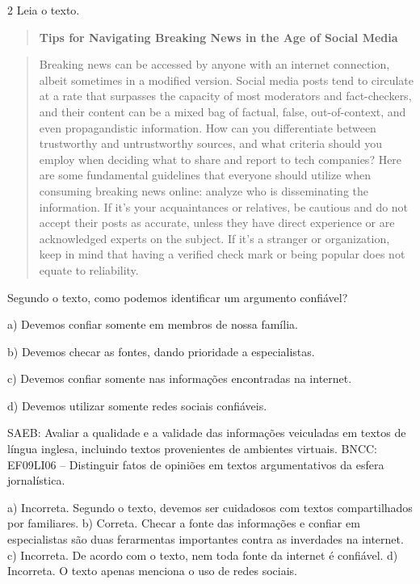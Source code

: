 \num{2} Leia o texto.

\begin{quote}
\textbf{Tips for Navigating Breaking News in the Age of Social Media}
\end{quote}

\begin{quote}
Breaking news can be accessed by anyone with an internet connection,
albeit sometimes in a modified version. Social media posts tend to
circulate at a rate that surpasses the capacity of most moderators and
fact-checkers, and their content can be a mixed bag of factual, false,
out-of-context, and even propagandistic information. How can you
differentiate between trustworthy and untrustworthy sources, and what
criteria should you employ when deciding what to share and report to
tech companies? Here are some fundamental guidelines that everyone
should utilize when consuming breaking news online: analyze who is
disseminating the information. If it's your acquaintances or relatives,
be cautious and do not accept their posts as accurate, unless they have
direct experience or are acknowledged experts on the subject. If it's a
stranger or organization, keep in mind that having a verified check mark
or being popular does not equate to reliability.
\end{quote}


Segundo o texto, como podemos identificar um argumento confiável?

a) Devemos confiar somente em membros de nossa família.

b) Devemos checar as fontes, dando prioridade a especialistas.

c) Devemos confiar somente nas informações encontradas na internet.

d) Devemos utilizar somente redes sociais confiáveis.

SAEB: Avaliar a qualidade e a validade das informações veiculadas em
textos de língua inglesa, incluindo textos provenientes de ambientes
virtuais. BNCC: EF09LI06 -- Distinguir fatos de opiniões em textos
argumentativos da esfera jornalística.

a) Incorreta. Segundo o texto, devemos ser cuidadosos com textos
compartilhados por familiares. b) Correta. Checar a fonte das
informações e confiar em especialistas são duas ferarmentas importantes
contra as inverdades na internet. c) Incorreta. De acordo com o texto,
nem toda fonte da internet é confiável. d) Incorreta. O texto apenas
menciona o uso de redes sociais.

